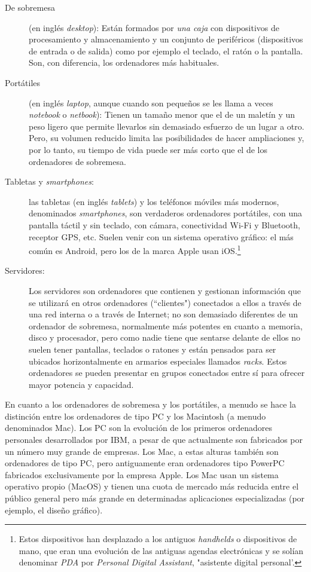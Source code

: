 \begin{description} \item[De sobremesa] (en inglés \emph{desktop}): Están formados por \emph{una caja} con dispositivos de procesamiento y almacenamiento y un conjunto de periféricos (dispositivos de entrada o de salida) como por ejemplo el teclado, el ratón o la pantalla. Son, con diferencia, los ordenadores más habituales. \item[Portátiles] (en inglés \emph{laptop}, aunque cuando son pequeños se les llama a veces \emph{notebook} o \emph{netbook}): Tienen un tamaño menor que el de un maletín y un peso ligero que permite llevarlos sin demasiado esfuerzo de un lugar a otro. Pero, su volumen reducido limita las posibilidades de hacer ampliaciones y, por lo tanto, su tiempo de vida puede ser más corto que el de los ordenadores de sobremesa. 

\item[Tabletas y \emph{smartphones}:] las tabletas (en inglés \emph{tablets}) y los teléfonos móviles más modernos, denominados \emph{smartphones}, son verdaderos ordenadores portátiles, con una pantalla táctil y sin teclado, con cámara, conectividad Wi-Fi y Bluetooth, receptor GPS, etc. Suelen venir con un sistema operativo gráfico: el más común es Android, pero los de la marca Apple usan iOS.\footnote{Estos dispositivos han desplazado a los antiguos \emph{handhelds} o dispositivos de mano, que eran una evolución de las antiguas agendas electrónicas y se solían denominar \emph{PDA} por \emph{Personal Digital Assistant}, "asistente digital personal'.} 

\item[Servidores:] Los servidores son ordenadores que contienen y gestionan información que se utilizará en otros ordenadores (``clientes") conectados a ellos a través de una red interna o a través de Internet; no son demasiado diferentes de un ordenador de sobremesa, normalmente más potentes en cuanto a memoria, disco y procesador, pero como nadie tiene que sentarse delante de ellos no suelen tener pantallas, teclados o ratones y están pensados para ser ubicados horizontalmente en armarios especiales llamados \emph{racks}. Estos ordenadores se pueden presentar en grupos conectados entre sí para ofrecer mayor potencia y capacidad. \end{description} 

En cuanto a los ordenadores de sobremesa y los portátiles, a menudo se hace la distinción entre los ordenadores de tipo PC y los Macintosh (a menudo denominados Mac). Los PC son la evolución de los primeros ordenadores personales desarrollados por IBM, a pesar de que actualmente son fabricados por un número muy grande de empresas. Los Mac, a estas alturas también son ordenadores de tipo PC, pero antiguamente eran ordenadores tipo PowerPC fabricados exclusivamente por la empresa Apple. Los Mac usan un sistema operativo propio (MacOS) y tienen una cuota de mercado más reducida entre el público general pero más grande en determinadas aplicaciones especializadas (por ejemplo, el diseño gráfico). 

